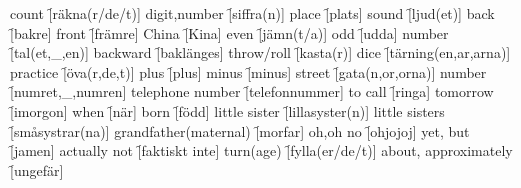 \begin{questions}
    \begin{multicols}{2}
        \raggedcolumns
        \question count \f[räkna(r/de/t)]
        \question digit,number \f[siffra(n)]
        \question place \f[plats]
        \question sound \f[ljud(et)]
        \question back \f[bakre]
        \question front \f[främre]
        \question China \f[Kina]
        \question even \f[jämn(t/a)]
        \question odd  \f[udda]
        \question number \f[tal(et,\_,en)]
        \question backward \f[baklänges]
        \question throw/roll \f[kasta(r)]
        \question dice \f[tärning(en,ar,arna)]
        \question practice \f[öva(r,de,t)]
        \question plus \f[plus]
        \question minus \f[minus]
        \question street \f[gata(n,or,orna)]
        \question number \f[numret,\_,numren]
        \question telephone number \f[telefonnummer]
        \question to call \f[ringa]
        \question tomorrow \f[imorgon]
        \question when \f[när]
        \question born \f[född]
        \question little sister \f[lillasyster(n)]
        \question little sisters \f[småsystrar(na)]
        \question grandfather(maternal) \f[morfar]
        \question oh,oh no \f[ohjojoj]
        \question yet, but \f[jamen]
        \question actually not \f[faktiskt inte]
        \question turn(age) \f[fylla(er/de/t)]
        \question about, approximately \f[ungefär]
    \end{multicols}
\end{questions}
